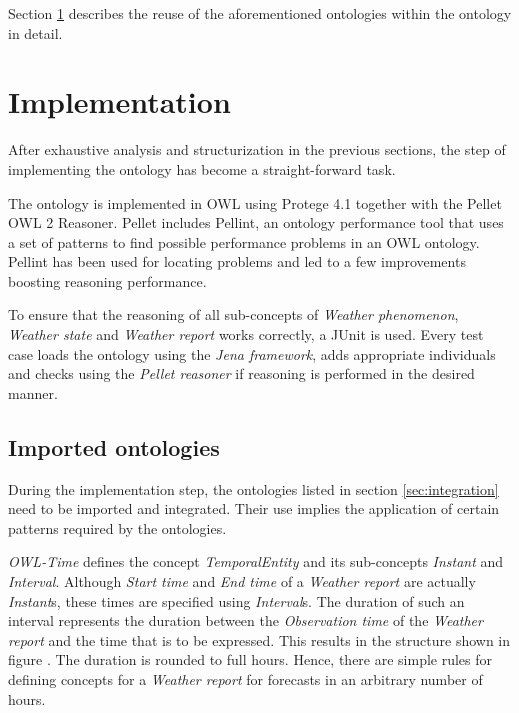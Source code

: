 
Section \ref{sec:implementation} describes the reuse of the aforementioned ontologies within the \thinkhomeweather ontology in detail.

\section{Implementation}
\label{sec:implementation}

After exhaustive analysis and structurization in the previous sections, the step of implementing the ontology has become a straight-forward task.

The \thinkhomeweather ontology is implemented in OWL using Protege 4.1 together with the Pellet OWL 2 Reasoner. Pellet includes Pellint, an ontology performance tool that uses a set of patterns to find possible performance problems in an OWL ontology. Pellint has been used for locating problems and led to a few improvements boosting reasoning performance.

To ensure that the reasoning of all sub-concepts of \emph{Weather phenomenon}, \emph{Weather state} and \emph{Weather report} works correctly, a JUnit is used. Every test case loads the \thinkhomeweather ontology using the \emph{Jena framework}, adds appropriate individuals and checks using the \emph{Pellet reasoner} if reasoning is performed in the desired manner.

\subsection{Imported ontologies}

During the implementation step, the ontologies listed in section \ref{sec:integration} need to be imported and integrated. Their use implies the application of certain patterns required by the ontologies.

\emph{OWL-Time} defines the concept \emph{TemporalEntity} and its sub-concepts \emph{Instant} and \emph{Interval}. Although \emph{Start time} and \emph{End time} of a \emph{Weather report} are actually \emph{Instant}s, these times are specified using \emph{Interval}s. The duration of such an interval represents the duration between the \emph{Observation time} of the \emph{Weather report} and the time that is to be expressed. This results in the structure shown in figure . %
The duration is rounded to full hours. Hence, there are simple rules for defining concepts for a \emph{Weather report} for forecasts in an arbitrary number of hours.

